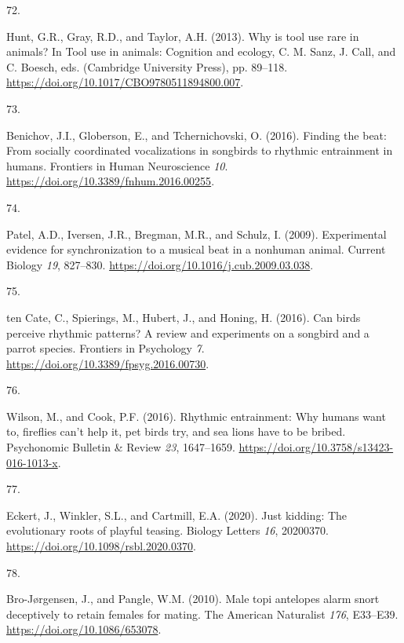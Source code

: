 \documentclass[
  man, donotrepeattitle,floatsintext]{apa6}
\newlength{\cslhangindent}
\newlength{\csllabelwidth}
\newlength{\cslentryspacingunit} %
\newenvironment{CSLReferences}[2] %
 {%
  \setlength{\parindent}{0pt}
  \ifodd #1
  \let\oldpar\par
  \def\par{\hangindent=\cslhangindent\oldpar}
  \fi
  \setlength{\parskip}{#2\cslentryspacingunit}
 }%
 {}
\newcommand{\CSLLeftMargin}[1]{\parbox[t]{\csllabelwidth}{#1}}
\newcommand{\CSLRightInline}[1]{\parbox[t]{\linewidth - \csllabelwidth}{#1}\break}
\begin{document}
\begin{CSLReferences}{0}{0}
\leavevmode{}%
\CSLLeftMargin{72. }%
\CSLRightInline{Hunt, G.R., Gray, R.D., and Taylor, A.H. (2013). Why is tool use rare in animals? In Tool use in animals: Cognition and ecology, C. M. Sanz, J. Call, and C. Boesch, eds. (Cambridge University Press), pp. 89--118. \url{https://doi.org/10.1017/CBO9780511894800.007}.}

\leavevmode{}%
\CSLLeftMargin{73. }%
\CSLRightInline{Benichov, J.I., Globerson, E., and Tchernichovski, O. (2016). Finding the beat: From socially coordinated vocalizations in songbirds to rhythmic entrainment in humans. Frontiers in Human Neuroscience \emph{10}. \url{https://doi.org/10.3389/fnhum.2016.00255}.}

\leavevmode{}%
\CSLLeftMargin{74. }%
\CSLRightInline{Patel, A.D., Iversen, J.R., Bregman, M.R., and Schulz, I. (2009). Experimental evidence for synchronization to a musical beat in a nonhuman animal. Current Biology \emph{19}, 827--830. \url{https://doi.org/10.1016/j.cub.2009.03.038}.}

\leavevmode{}%
\CSLLeftMargin{75. }%
\CSLRightInline{ten Cate, C., Spierings, M., Hubert, J., and Honing, H. (2016). Can birds perceive rhythmic patterns? A review and experiments on a songbird and a parrot species. Frontiers in Psychology \emph{7}. \url{https://doi.org/10.3389/fpsyg.2016.00730}.}

\leavevmode{}%
\CSLLeftMargin{76. }%
\CSLRightInline{Wilson, M., and Cook, P.F. (2016). Rhythmic entrainment: Why humans want to, fireflies can't help it, pet birds try, and sea lions have to be bribed. Psychonomic Bulletin \& Review \emph{23}, 1647--1659. \url{https://doi.org/10.3758/s13423-016-1013-x}.}

\leavevmode{}%
\CSLLeftMargin{77. }%
\CSLRightInline{Eckert, J., Winkler, S.L., and Cartmill, E.A. (2020). Just kidding: The evolutionary roots of playful teasing. Biology Letters \emph{16}, 20200370. \url{https://doi.org/10.1098/rsbl.2020.0370}.}

\leavevmode{}%
\CSLLeftMargin{78. }%
\CSLRightInline{Bro-Jørgensen, J., and Pangle, W.M. (2010). Male topi antelopes alarm snort deceptively to retain females for mating. The American Naturalist \emph{176}, E33--E39. \url{https://doi.org/10.1086/653078}.}


\end{CSLReferences}
\end{document}
